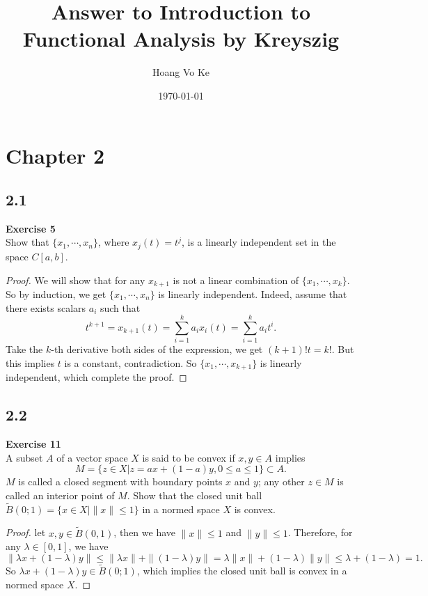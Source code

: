 \documentclass[12pt, a4paper]{article}
\title{Answer to Introduction to Functional Analysis by Kreyszig}
\author{Hoang Vo Ke}
\date{\today}
\theoremstyle{plain}
\newenvironment{exercise}[2][Exercise]
    { \begin{mdframed}[backgroundcolor=gray!20] \textbf{#1 #2} \\}
    {  \end{mdframed}}
\begin{document}
\maketitle

\section*{Chapter 2}
\subsection*{2.1}

\begin{exercise}{5}
Show that $\{x_1,\cdots,x_n\}$, where $x_j(t) = t^j$, is a linearly independent set in the space $C[a,b]$.
\end{exercise}
	\begin{proof}
	We will show that for any $x_{k+1}$ is not a linear combination of $\{x_1,\cdots,x_k\}$. So by induction, we get $\{x_1,\cdots, x_n\}$ is linearly independent. Indeed, assume that there exists scalars $a_i$ such that
	\[
	t^{k+1} = x_{k+1}(t) = \sum_{i=1}^{k}{a_ix_i(t)} = \sum_{i=1}^{k}{a_it^i}.
	\]
	Take the $k$-th derivative both sides of the expression, we get $(k+1)!t = k!$. But this implies $t$ is a constant, contradiction. So $\{x_1,\cdots,x_{k+1}\}$ is linearly independent, which complete the proof.
	\end{proof}

\subsection*{2.2}
\begin{exercise}{11}
A subset $A$ of a vector space $X$ is said to be convex if $x,y\in A$ implies 
\[
M=\{z\in X |z=ax+(1-a)y, 0\leq a\leq 1\}\subset A.
\]
$M$ is called a closed segment with boundary points $x$ and $y$; any other $z\in M$ is called an interior point of $M$. Show that the closed unit ball $\tilde{B}(0;1)=\{x\in X|\|x\|\leq 1\}$ in a normed space $X$ is convex.
\end{exercise}
	\begin{proof}
	let $x,y\in \tilde{B}(0,1)$, then we have $\|x\|\leq 1$ and $\|y\|\leq 1$. Therefore, for any $\lambda \in [0,1]$, we have
	\[
	\|\lambda x+(1-\lambda)y\|\leq \|\lambda x\|+\|(1-\lambda)y\|=\lambda\|x\|+(1-\lambda)\|y\|\leq \lambda + (1-\lambda) = 1.
	\]
	So $\lambda x+(1-\lambda)y\in\tilde{B}(0;1)$, which implies the closed unit ball is convex in a normed space $X$.
	\end{proof}
	
\end{document}
